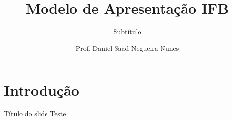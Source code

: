\documentclass{apresentacao-ifb}
\author{Prof. Daniel Saad Nogueira Nunes}
\title{Modelo de Apresentação IFB}
\subtitle{Subtítulo}
\institute{Instituto Federal de Brasília, Câmpus Taguatinga}
\date{}
\begin{document}
\maketitle

\section{Introdução}

\begin{frame}{Título do slide}
	Teste
\end{frame}
\end{document}
